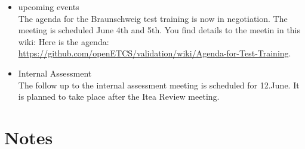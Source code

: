 \documentclass[a4paper, 11pt]{article}
\begin{document}
\begin{itemize}
\item upcoming events\\
The agenda for the Braunschweig test training is now in negotiation. The meeting is scheduled June 4th and 5th. You find details to the meetin in this wiki: Here is the agenda: \url{https://github.com/openETCS/validation/wiki/Agenda-for-Test-Training}.

\item Internal Assessment\\
The follow up to the internal assessment meeting is scheduled for 12.June. It is planned to take place after the Itea Review meeting.

\end{itemize}

\section{Notes}
\end{document}
